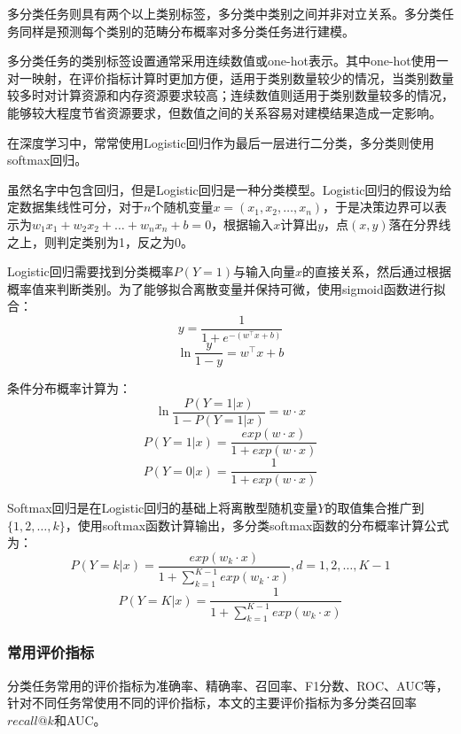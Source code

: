 \documentclass[master]{thesis-uestc}
\begin{document}
多分类任务则具有两个以上类别标签，多分类中类别之间并非对立关系。多分类任务同样是预测每个类别的范畴分布概率对多分类任务进行建模。

多分类任务的类别标签设置通常采用连续数值或one-hot表示。其中one-hot使用一对一映射，在评价指标计算时更加方便，适用于类别数量较少的情况，当类别数量较多时对计算资源和内存资源要求较高；连续数值则适用于类别数量较多的情况，能够较大程度节省资源要求，但数值之间的关系容易对建模结果造成一定影响。

在深度学习中，常常使用Logistic回归作为最后一层进行二分类，多分类则使用softmax回归。

虽然名字中包含回归，但是Logistic回归是一种分类模型。Logistic回归的假设为给定数据集线性可分，对于$n$个随机变量$x=(x_1,x_2,\dots,x_n)$，于是决策边界可以表示为$w_1x_1+w_2x_2+\dots+w_nx_n+b=0$，根据输入$x$计算出$y$，点$(x,y)$落在分界线之上，则判定类别为1，反之为0。

Logistic回归需要找到分类概率$P(Y=1)$与输入向量$x$的直接关系，然后通过根据概率值来判断类别。为了能够拟合离散变量并保持可微，使用sigmoid函数进行拟合：
\begin{equation}
   y=\frac{1}{1+e^{-(w^{\top}x+b)}}
\end{equation}
\begin{equation}
   \ln\frac{y}{1-y}=w^{\top}x+b
\end{equation}

条件分布概率计算为：
\begin{equation}
   \ln \frac{P(Y=1|x)}{1-P(Y=1|x)}=w\cdot x
\end{equation}
\begin{equation}
   P(Y=1|x)=\frac{exp(w\cdot x)}{1+exp(w\cdot x)}
\end{equation}
\begin{equation}
   P(Y=0|x)=\frac{1}{1+exp(w\cdot x)}
\end{equation}

Softmax回归是在Logistic回归的基础上将离散型随机变量$Y$的取值集合推广到$\{1,2,\dots,k\}$，使用softmax函数计算输出，多分类softmax函数的分布概率计算公式为：
\begin{equation}
   P(Y=k|x)=\frac{exp(w_k\cdot x)}{1+\sum_{k=1}^{K-1}exp(w_k\cdot x)},d=1,2,\dots,K-1
\end{equation}
\begin{equation}
   P(Y=K|x)=\frac{1}{1+\sum_{k=1}^{K-1}exp(w_k\cdot x)}
\end{equation}

\subsubsection{常用评价指标}
分类任务常用的评价指标为准确率、精确率、召回率、F1分数、ROC、AUC等，针对不同任务常使用不同的评价指标，本文的主要评价指标为多分类召回率$recall@k$和AUC。
\end{document}
